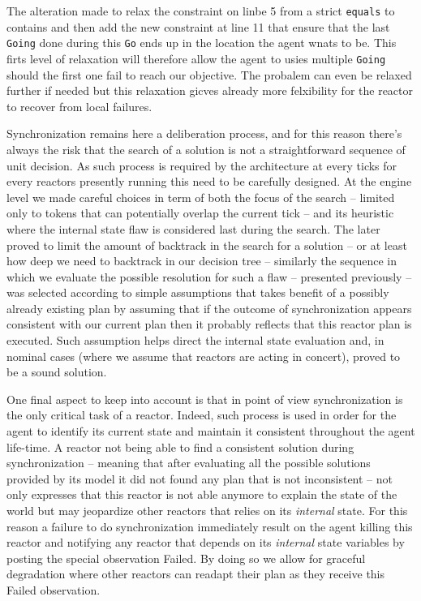 The alteration made to relax the constraint on linbe 5 from a strict 
\texttt{equals} to contains and then add the new constraint at line 11
that ensure that the last \texttt{Going} done during this \texttt{Go}
ends up in the location the agent wnats to be. This firts level of
relaxation will therefore allow the agent to usies multiple
\texttt{Going} should the first one fail to reach our objective.  The
probalem can even be relaxed further if needed but this relaxation
gicves already more felxibility for the reactor to recover from local
failures.

Synchronization remains here a deliberation process, and for this
reason there's always the risk that the search of a solution is not a
straightforward sequence of unit decision. As such process is required
by the architecture at every ticks for every reactors presently
running this need to be carefully designed. At the engine level we
made careful choices in term of both the focus of the search --
limited only to tokens that can potentially overlap the current tick
-- and its heuristic where the internal state flaw is considered last
during the search. The later proved to limit the amount of backtrack
in the search for a solution -- or at least how deep we need to
backtrack in our decision tree -- similarly the sequence in which we
evaluate the possible resolution for such a flaw -- presented
previously -- was selected according to simple assumptions that takes
benefit of a possibly already existing plan by assuming that if the
outcome of synchronization appears consistent with our current plan
then it probably reflects that this reactor plan is executed. Such
assumption helps direct the internal state evaluation and, in nominal
cases (where we assume that reactors are acting in concert), proved to
be a sound solution.

One final aspect to keep into account is that in \rx point of view
synchronization is the only critical task of a reactor. Indeed, such
process is used in order for the agent to identify its current state
and maintain it consistent throughout the agent life-time. A reactor
not being able to find a consistent solution during synchronization --
meaning that after evaluating all the possible solutions provided by
its model it did not found any plan that is not inconsistent -- not
only expresses that this reactor is not able anymore to explain the
state of the world but may jeopardize other reactors that relies on
its {\em internal} state. For this reason a failure to do
synchronization immediately result on the agent killing this reactor
and notifying any reactor that depends on its {\em internal} state
variables by posting the special observation \textsf{Failed}. By doing
so we allow for graceful degradation where other reactors can readapt
their plan as they receive this \textsf{Failed} observation.

